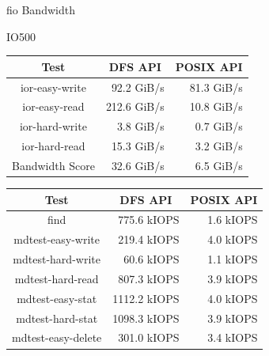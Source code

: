\documentclass[final]{beamer}
\newlength{\colwidth}
\begin{document}
\begin{frame}[t, fragile]
\begin{columns}[t]
\begin{column}{\colwidth}
\begin{block}{fio Bandwidth}


    
  \end{block}

  \begin{block}{IO500}
    ~\\
    \renewcommand{\arraystretch}{1.4}
    \setlength{\tabcolsep}{15pt}
    \begin{minipage}[t]{0.48\colwidth}
      \centering
      {\small
      \begin{tabular}{|c|r|r|}
        \hline
        Test & \multicolumn{1}{c|}{DFS API} & \multicolumn{1}{c|}{POSIX API} \\
        \hline \hline
        ior-easy-write & 92.2 GiB/s & 81.3 GiB/s \\
        ior-easy-read & 212.6 GiB/s & 10.8 GiB/s \\
        ior-hard-write & 3.8 GiB/s & 0.7 GiB/s \\
        ior-hard-read & 15.3 GiB/s & 3.2 GiB/s \\
        \hline
        Bandwidth Score & 32.6 GiB/s & 6.5 GiB/s \\
        \hline
      \end{tabular}
      }
    \end{minipage}
    \hfill
    \begin{minipage}[t]{0.48\colwidth}
      \centering
      {\small 
      \begin{tabular}{|c|r|r|}
        \hline
        Test & \multicolumn{1}{c|}{DFS API} & \multicolumn{1}{c|}{POSIX API} \\
        \hline \hline
        find & 775.6 kIOPS & 1.6 kIOPS \\
        mdtest-easy-write & 219.4 kIOPS & 4.0 kIOPS \\
        mdtest-hard-write & 60.6 kIOPS & 1.1 kIOPS \\
        mdtest-hard-read & 807.3 kIOPS & 3.9 kIOPS \\
        mdtest-easy-stat & 1112.2 kIOPS & 4.0 kIOPS \\
        mdtest-hard-stat & 1098.3 kIOPS & 3.9 kIOPS \\
        mdtest-easy-delete & 301.0 kIOPS & 3.4 kIOPS \\

\end{tabular}}
\end{minipage}
\end{block}
\end{column}
\end{columns}
\end{frame}
\end{document}
